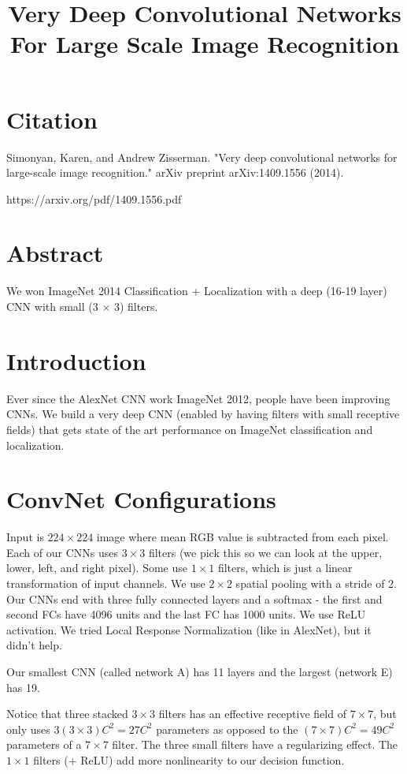 \documentclass[a4paper]{article}
\title{Very Deep Convolutional Networks For Large Scale Image Recognition}
\date{}
\begin{document}
\maketitle

\section{Citation}

Simonyan, Karen, and Andrew Zisserman. "Very deep convolutional networks for large-scale image recognition." arXiv preprint arXiv:1409.1556 (2014).

https://arxiv.org/pdf/1409.1556.pdf

\section{Abstract}
We won ImageNet 2014 Classification + Localization with a deep (16-19 layer)
CNN with small (3 $\times$ 3) filters.

\section{Introduction}
Ever since the AlexNet CNN work ImageNet 2012, people have been improving CNNs.
We build a very deep CNN (enabled by having filters with small receptive fields)
that gets state of the art performance on ImageNet classification and
localization.

\section{ConvNet Configurations}
Input is $224 \times 224$ image where mean RGB value is subtracted from each
pixel. Each of our CNNs uses $3 \times 3$ filters (we pick this so we can look
at the upper, lower, left, and right pixel). Some use $1 \times 1$ filters,
which is just a linear transformation of input channels. We use $2 \times 2$
spatial pooling with a stride of 2. Our CNNs end with three fully connected
layers and a softmax - the first and second FCs have 4096 units and the last FC
has 1000 units. We use ReLU activation. We tried Local Response Normalization
(like in AlexNet), but it didn't help.

Our smallest CNN (called network A) has 11 layers and the largest (network E)
has 19.

Notice that three stacked $3 \times 3$ filters has an effective receptive field
of $7 \times 7$, but only uses $3(3 \times 3)C^2 = 27C^2$ parameters as opposed
to the $(7 \times 7)C^2 = 49C^2$ parameters of a $7 \times 7$ filter. The three
small filters have a regularizing effect. The $1 \times 1$ filters (+ ReLU)
add more nonlinearity to our decision function.
\end{document}
